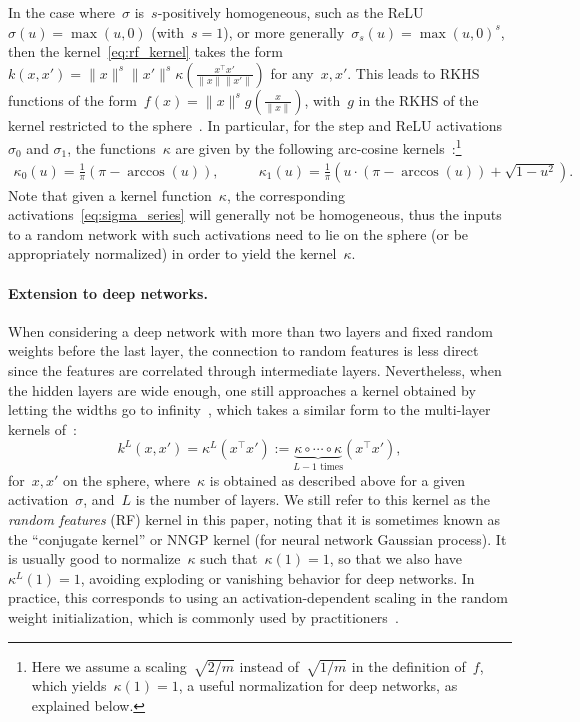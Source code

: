 In the case where~$\sigma$ is~$s$-positively homogeneous, such as the ReLU~$\sigma(u) = \max(u, 0)$ (with~$s = 1$), or more generally~$\sigma_s(u) = \max(u, 0)^s$, then the kernel~\eqref{eq:rf_kernel} takes the form~$k(x, x') = \|x\|^s \|x'\|^s \kappa(\frac{x^\top x'}{\|x\| \|x'\|})$ for any~$x, x'$. This leads to RKHS functions of the form~$f(x) = \|x\|^s g(\frac{x}{\|x\|})$, with~$g$ in the RKHS of the kernel restricted to the sphere~\citep[Prop. 8]{bietti2019inductive}.
In particular, for the step and ReLU activations~$\sigma_0$ and $\sigma_1$, the functions~$\kappa$ are given by the following arc-cosine kernels~\citep{cho2009kernel}:\footnote{Here we assume a scaling~$\sqrt{2/m}$ instead of~$\sqrt{1/m}$ in the definition of~$f$, which yields~$\kappa(1) = 1$, a useful normalization for deep networks, as explained below.}
\begin{align}
\kappa_0(u) = \frac{1}{\pi} \left( \pi - \arccos(u) \right),  &\qquad
\kappa_1(u) = \frac{1}{\pi} \left( u \cdot (\pi - \arccos(u)) + \sqrt{1 - u^2} \right) \label{eq:kappa_arccos}.
\end{align}
Note that given a kernel function~$\kappa$, the corresponding activations~\eqref{eq:sigma_series} will generally not be homogeneous, thus the inputs to a random network with such activations need to lie on the sphere (or be appropriately normalized) in order to yield the kernel~$\kappa$.

\paragraph{Extension to deep networks.}
When considering a deep network with more than two layers and fixed random weights before the last layer, the connection to random features is less direct since the features are correlated through intermediate layers.
Nevertheless, when the hidden layers are wide enough, one still approaches a kernel obtained by letting the widths go to infinity~\citep[see, \eg,][]{daniely2016toward,lee2018deep,matthews2018gaussian}, which takes a similar form to the multi-layer kernels of~\citet{cho2009kernel}:
\begin{equation*}
k^L(x, x') = \kappa^L(x^\top x') := \underbrace{\kappa \circ \cdots \circ \kappa}_{L-1\text{ times}}(x^\top x'),
\end{equation*}
for~$x, x'$ on the sphere,
where~$\kappa$ is obtained as described above for a given activation~$\sigma$, and~$L$ is the number of layers.
We still refer to this kernel as the \emph{random features} (RF) kernel in this paper, noting that it is sometimes known as the ``conjugate kernel'' or NNGP kernel (for neural network Gaussian process).
It is usually good to normalize~$\kappa$ such that~$\kappa(1) = 1$, so that we also have~$\kappa^L(1) = 1$, avoiding exploding or vanishing behavior for deep networks.
In practice, this corresponds to using an activation-dependent scaling in the random weight initialization, which is commonly used by practitioners~\citep{he2015delving}.


